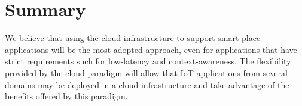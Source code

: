 \section{Summary}
\label{sec:conclusion_summary}
We believe that using the cloud infrastructure to support smart place applications will be the
most adopted approach, even for applications that have strict requirements such for low-latency
and context-awareness. The flexibility provided by the cloud paradigm will allow that
\gls{IoT} applications from several domains may be deployed in a cloud infrastructure and take
advantage of the benefits offered by this paradigm.

